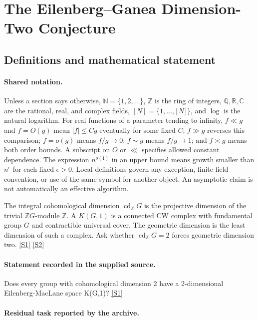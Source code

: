 \documentclass[11pt,a4paper]{article}
\newcommand{\N}{\mathbb{N}}
\newcommand{\Z}{\mathbb{Z}}
\newcommand{\Q}{\mathbb{Q}}
\newcommand{\R}{\mathbb{R}}
\newcommand{\C}{\mathbb{C}}
\newcommand{\sref}[2]{\hyperlink{source:#1:#2}{[S#2]}}
\begin{document}
\section{The Eilenberg--Ganea Dimension-Two Conjecture}\label{statement}


\subsection{Definitions and mathematical statement}

\paragraph{Shared notation.}Unless a section says otherwise, $\N=\{1,2,\ldots\}$,
$\Z$ is the ring of integers, $\Q,\R,\C$ are the rational, real, and complex
fields, $[N]=\{1,\ldots,\lfloor N\rfloor\}$, and $\log$ is the natural
logarithm. For real functions of a parameter tending to infinity,
$f\ll g$ and $f=O(g)$ mean $|f|\leq Cg$ eventually for some fixed $C$;
$f\gg g$ reverses this comparison; $f=o(g)$ means $f/g\to0$;
$f\sim g$ means $f/g\to1$; and $f\asymp g$ means both order bounds.
A subscript on $O$ or $\ll$ specifies allowed constant dependence.
The expression $n^{o(1)}$ in an upper bound means growth smaller than
$n^\epsilon$ for each fixed $\epsilon>0$. Local definitions govern any
exception, finite-field convention, or use of the same symbol for another
object. An asymptotic claim is not automatically an effective algorithm.



The integral cohomological dimension $\operatorname{cd}_{\Z}G$ is the projective dimension of the trivial $\Z G$-module $\Z$. A $K(G,1)$ is a connected CW complex with fundamental group $G$ and contractible universal cover. The geometric dimension is the least dimension of such a complex. Ask whether $\operatorname{cd}_{\Z}G=2$ forces geometric dimension two. \sref{statement}{1} \sref{statement}{2}

\paragraph{Statement recorded in the supplied source.}
Does every group with cohomological dimension 2 have a 2-dimensional Eilenberg-MacLane space K(G,1)? \sref{statement}{1}

\paragraph{Residual task reported by the archive.}
\end{document}
